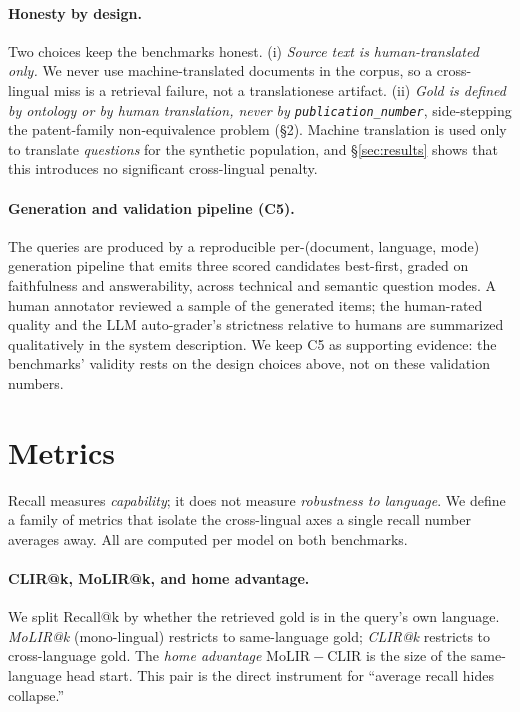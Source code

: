 \documentclass[11pt]{article}
\begin{document}
\paragraph{Honesty by design.}
Two choices keep the benchmarks honest. (i) \emph{Source text is
human-translated only.} We never use machine-translated documents in the
corpus, so a cross-lingual miss is a retrieval failure, not a translationese
artifact. (ii) \emph{Gold is defined by ontology or by human translation, never
by \texttt{publication\_number}}, side-stepping the patent-family
non-equivalence problem (\S2). Machine translation is used only to translate
\emph{questions} for the synthetic population, and \S\ref{sec:results} shows
that this introduces no significant cross-lingual penalty.

\paragraph{Generation and validation pipeline (C5).}
The queries are produced by a reproducible per-(document, language, mode)
generation pipeline that emits three scored candidates best-first, graded on
faithfulness and answerability, across technical and semantic question modes. A
human annotator reviewed a sample of the generated items; the human-rated
quality and the LLM auto-grader's strictness relative to humans are summarized
qualitatively in the system description. We keep C5 as supporting evidence: the
benchmarks' validity rests on the design choices above, not on these validation
numbers.

\section{Metrics}
\label{sec:metrics}

Recall measures \emph{capability}; it does not measure \emph{robustness to
language}. We define a family of metrics that isolate the cross-lingual axes a
single recall number averages away. All are computed per model on both
benchmarks.

\paragraph{CLIR@k, MoLIR@k, and home advantage.}
We split Recall@k by whether the retrieved gold is in the query's own language.
\emph{MoLIR@k} (mono-lingual) restricts to same-language gold; \emph{CLIR@k}
restricts to cross-language gold. The \emph{home advantage}
$\mathrm{MoLIR}{-}\mathrm{CLIR}$ is the size of the same-language head start.
This pair is the direct instrument for ``average recall hides collapse.''
\end{document}
